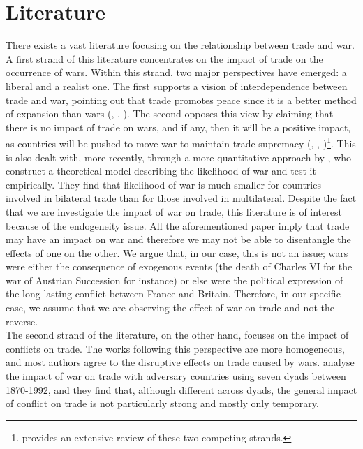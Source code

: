 \documentclass[12pt,a4paper,notitlepage,english]{article}
\begin{document}
\section{Literature} \label{literature}
There exists a vast literature focusing on the relationship between trade and war.
A first strand of this literature concentrates on the impact of trade on the occurrence of wars.
Within this strand, two major perspectives have emerged: a liberal and a realist one.
The first supports a vision of interdependence between trade and war, pointing out that trade promotes peace since it is a better method of expansion than wars (\cite{doyle1997ways}, \cite{oneal1997classical}, \cite{polachek1980conflict}).
The second opposes this view by claiming that there is no impact of trade on wars, and if any, then it will be a positive impact, as countries will be pushed to move war to maintain trade supremacy (\cite{ripsman1996commercial}, \cite{levy1989causes}, \cite{buzan1984economic})\footnote{\cite{mcmillan1997interdependence} provides an extensive review of these two competing strands.}.
This is also dealt with, more recently, through a more quantitative approach by \cite{martin2008make}, who construct a theoretical model describing the likelihood of war and test it empirically.
They find that likelihood of war is much smaller for countries involved in bilateral trade than for those involved in multilateral.
Despite the fact that we are investigate the impact of war on trade, this literature is of interest because of the endogeneity issue.
All the aforementioned paper imply that trade may have an impact on war and therefore we may not be able to disentangle the effects of one on the other.
We argue that, in our case, this is not an issue; wars were either the consequence of exogenous events (the death of Charles VI for the war of Austrian Succession for instance) or else were the political expression of the long-lasting conflict between France and Britain.
Therefore, in our specific case, we assume that we are observing the effect of war on trade and not the reverse.\\
The second strand of the literature, on the other hand, focuses on the impact of conflicts on trade.
The works following this perspective are more homogeneous, and most authors agree to the disruptive effects on trade caused by wars.
\cite{levy2004trading} analyse the impact of war on trade with adversary countries using seven dyads between 1870-1992, and they find that, although different across dyads, the general impact of conflict on trade is not particularly strong and mostly only temporary.
\end{document}
